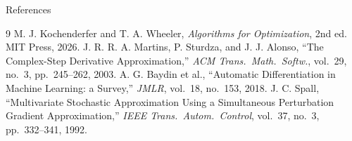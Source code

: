 \documentclass[aspectratio=169,10pt]{beamer}
\begin{document}
\begin{frame}{References}
  \begin{thebibliography}{9}
      M. J. Kochenderfer and T. A. Wheeler,
      \textit{Algorithms for Optimization}, 2nd ed.
      MIT Press, 2026.
      J. R. R. A. Martins, P. Sturdza, and J. J. Alonso,
      ``The Complex-Step Derivative Approximation,''
      \textit{ACM Trans.\ Math.\ Softw.}, vol.\ 29, no.\ 3,
      pp.\ 245--262, 2003.
      A. G. Baydin et al.,
      ``Automatic Differentiation in Machine Learning: a Survey,''
      \textit{JMLR}, vol.\ 18, no.\ 153, 2018.
      J. C. Spall,
      ``Multivariate Stochastic Approximation Using a Simultaneous
      Perturbation Gradient Approximation,''
      \textit{IEEE Trans.\ Autom.\ Control},
      vol.\ 37, no.\ 3, pp.\ 332--341, 1992.
  \end{thebibliography}
\end{frame}
\end{document}
